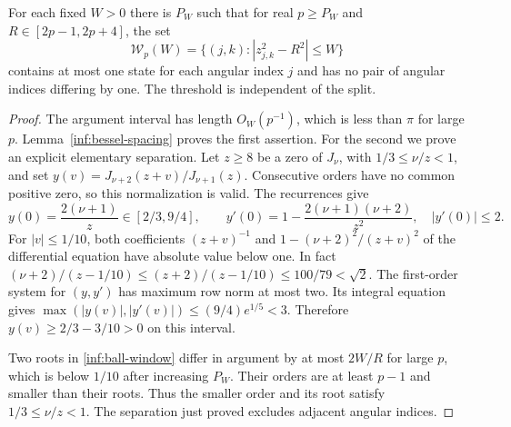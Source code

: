 \begin{lemma}
\label{inf:window-isolation}
For each fixed $W>0$ there is $P_W$ such that for real $p\ge P_W$ and
$R\in[2p-1,2p+4]$, the set
\begin{equation}\label{inf:ball-window}
 \mathcal W_p(W)=\{(j,k):|z_{j,k}^2-R^2|\le W\}
\end{equation}
contains at most one state for each angular index $j$ and has no pair
of angular indices differing by one. The threshold is independent of
the split.
\end{lemma}
\begin{proof}
The argument interval has length $O_W(p^{-1})$, which is less than
$\pi$ for large $p$. Lemma~\ref{inf:bessel-spacing} proves the first
assertion. For the second we prove an explicit elementary separation.
Let $z\ge8$ be a zero of $J_\nu$, with $1/3\le\nu/z<1$, and set
$y(v)=J_{\nu+2}(z+v)/J_{\nu+1}(z)$. Consecutive orders have no common
positive zero, so this normalization is valid. The recurrences give
\[
 y(0)=\frac{2(\nu+1)}z\in[2/3,9/4],\qquad
 y'(0)=1-\frac{2(\nu+1)(\nu+2)}{z^2},\quad |y'(0)|\le2.
\]
For $|v|\le1/10$, both coefficients
$(z+v)^{-1}$ and $1-(\nu+2)^2/(z+v)^2$ of the differential equation
have absolute value below one. In fact
$(\nu+2)/(z-1/10)\le(z+2)/(z-1/10)\le100/79<\sqrt2$.
The first-order system for $(y,y')$ has maximum row norm at most two.
Its integral equation gives
$\max(|y(v)|,|y'(v)|)\le(9/4)e^{1/5}<3$. Therefore
$y(v)\ge2/3-3/10>0$ on this interval.

Two roots in \eqref{inf:ball-window} differ in argument by at most
$2W/R$ for large $p$, which is below $1/10$ after increasing $P_W$.
Their orders are at least $p-1$ and smaller than their roots.
Thus the smaller order and its root satisfy $1/3\le\nu/z<1$.
The separation just proved excludes adjacent angular indices.
\end{proof}

